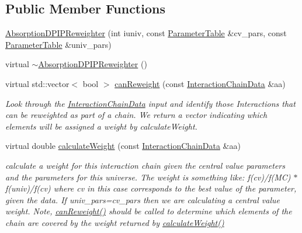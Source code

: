 \subsection*{Public Member Functions}
\begin{DoxyCompactItemize}
\item 
\hyperlink{class_neutrino_flux_reweight_1_1_absorption_d_p_i_p_reweighter_a3665b9d316e77f15a25c032a091271e1}{Absorption\-D\-P\-I\-P\-Reweighter} (int iuniv, const \hyperlink{class_neutrino_flux_reweight_1_1_parameter_table}{Parameter\-Table} \&cv\-\_\-pars, const \hyperlink{class_neutrino_flux_reweight_1_1_parameter_table}{Parameter\-Table} \&univ\-\_\-pars)
\item 
virtual \hyperlink{class_neutrino_flux_reweight_1_1_absorption_d_p_i_p_reweighter_a61fd56f21c1b98f1b789afd9be0c659e}{$\sim$\-Absorption\-D\-P\-I\-P\-Reweighter} ()
\item 
virtual std\-::vector$<$ bool $>$ \hyperlink{class_neutrino_flux_reweight_1_1_absorption_d_p_i_p_reweighter_a9fc3f50ccda671f623473e43ba49989f}{can\-Reweight} (const \hyperlink{class_neutrino_flux_reweight_1_1_interaction_chain_data}{Interaction\-Chain\-Data} \&aa)
\begin{DoxyCompactList}\small\item\em Look through the \hyperlink{class_neutrino_flux_reweight_1_1_interaction_chain_data}{Interaction\-Chain\-Data} input and identify those Interactions that can be reweighted as part of a chain. We return a vector indicating which elements will be assigned a weight by calculate\-Weight. \end{DoxyCompactList}\item 
virtual double \hyperlink{class_neutrino_flux_reweight_1_1_absorption_d_p_i_p_reweighter_a8b1fcaecb31a3612ec2f5e2a0026bcb6}{calculate\-Weight} (const \hyperlink{class_neutrino_flux_reweight_1_1_interaction_chain_data}{Interaction\-Chain\-Data} \&aa)
\begin{DoxyCompactList}\small\item\em calculate a weight for this interaction chain given the central value parameters and the parameters for this universe. The weight is something like\-: f(cv)/f(M\-C) $\ast$ f(univ)/f(cv) where cv in this case corresponds to the best value of the parameter, given the data. If univ\-\_\-pars=cv\-\_\-pars then we are calculating a central value weight. Note, \hyperlink{class_neutrino_flux_reweight_1_1_absorption_d_p_i_p_reweighter_a9fc3f50ccda671f623473e43ba49989f}{can\-Reweight()} should be called to determine which elements of the chain are covered by the weight returned by \hyperlink{class_neutrino_flux_reweight_1_1_absorption_d_p_i_p_reweighter_a8b1fcaecb31a3612ec2f5e2a0026bcb6}{calculate\-Weight()} \end{DoxyCompactList}\end{DoxyCompactItemize}
